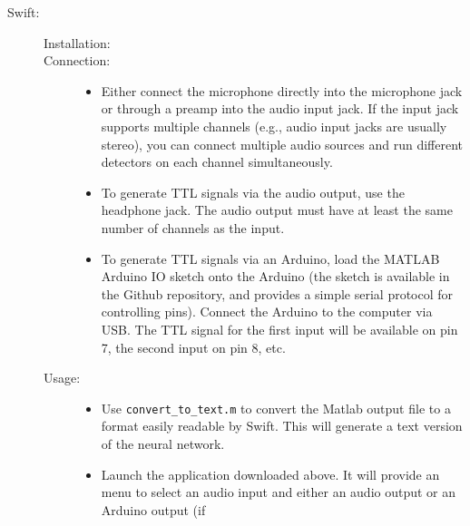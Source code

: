 \documentclass[10pt,letterpaper]{article}
\providecommand{\DIFaddtex}[1]{{\protect\color{blue}\uwave{#1}}} %
\providecommand{\DIFdeltex}[1]{{\protect\color{red}\sout{#1}}}                      %
\providecommand{\DIFaddbegin}{} %
\providecommand{\DIFaddend}{} %
\providecommand{\DIFdelbegin}{} %
\providecommand{\DIFdelend}{} %
\providecommand{\DIFadd}[1]{\texorpdfstring{\DIFaddtex{#1}}{#1}} %
\providecommand{\DIFdel}[1]{\texorpdfstring{\DIFdeltex{#1}}{}} %
\begin{document}
\begin{description}
\begin{description}
  \DIFaddend \item[Swift:]\DIFaddbegin \hfill
    \DIFaddend  \begin{description} 
    \item[Installation:]\hfill
    \item[Connection:]\hfill
       \begin{itemize} 
      \item Either connect the microphone directly into the microphone jack or through a 
      preamp into the audio input jack. If the input jack supports multiple channels (e.g., 
      audio input jacks are usually stereo), you can connect multiple audio sources and run 
      different detectors on each channel simultaneously.
      \item To generate TTL signals via the audio output, use the headphone jack. The 
      audio output must have at least the same number of channels as the input.
      \item To generate TTL signals via an Arduino, load the MATLAB Arduino IO sketch 
      onto the Arduino (the sketch is available in the Github repository, and provides a 
      simple serial protocol for controlling pins). Connect the Arduino 
      to the computer via USB. The TTL signal for the first input will be available on 
      pin 7, the second input on pin 8, etc.
       \end{itemize} 
    \item[Usage:]\hfill
       \begin{itemize} 
      \item Use {\tt convert\_to\_text.m} to convert the Matlab output file to a format 
      easily readable by Swift. This will generate a text version of the neural network.
      \item Launch the application downloaded above. It will provide an 
      menu to select an audio input and either an audio output or an Arduino output (if 

\end{itemize}
\end{description}
\end{description}
\end{description}
\end{document}
